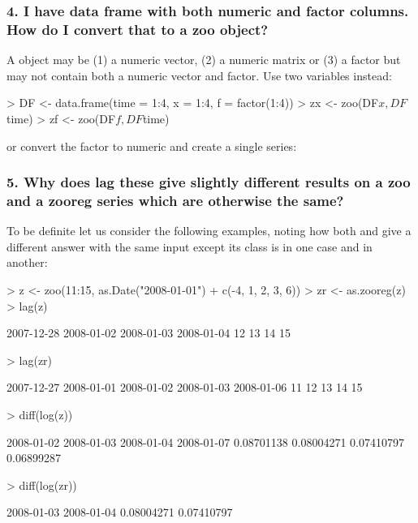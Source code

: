 \documentclass{Z}
\newcommand{\mysection}[1]{\subsubsection[#1]{\textbf{#1}}}
\begin{document}
\mysection{4. I have data frame with both numeric and factor columns.  How do I convert that to a zoo object?}

A  object may be (1) a numeric vector, (2) a numeric matrix or 
(3) a factor but may not contain both a numeric vector and factor.  
Use two  variables instead:

\begin{Schunk}
\begin{Sinput}
> DF <- data.frame(time = 1:4, x = 1:4, f = factor(1:4))
> zx <- zoo(DF$x, DF$time)
> zf <- zoo(DF$f, DF$time)
\end{Sinput}
\end{Schunk}

or convert the factor to numeric and create a single
 series:

\begin{Schunk}
\end{Schunk}

\mysection{5. Why does lag these give slightly different results on a zoo and a zooreg series which are otherwise the same?}

To be definite let us consider the following examples, noting how 
both  and  give a different answer with the same 
input except its class is  in one case and  in 
another:
\begin{Schunk}
\begin{Sinput}
> z <- zoo(11:15, as.Date("2008-01-01") + c(-4, 1, 2, 3, 6))
> zr <- as.zooreg(z)
> lag(z)
\end{Sinput}
\begin{Soutput}
2007-12-28 2008-01-02 2008-01-03 2008-01-04 
        12         13         14         15 
\end{Soutput}
\begin{Sinput}
> lag(zr)
\end{Sinput}
\begin{Soutput}
2007-12-27 2008-01-01 2008-01-02 2008-01-03 2008-01-06 
        11         12         13         14         15 
\end{Soutput}
\begin{Sinput}
> diff(log(z))
\end{Sinput}
\begin{Soutput}
2008-01-02 2008-01-03 2008-01-04 2008-01-07 
0.08701138 0.08004271 0.07410797 0.06899287 
\end{Soutput}
\begin{Sinput}
> diff(log(zr))
\end{Sinput}
\begin{Soutput}
2008-01-03 2008-01-04 
0.08004271 0.07410797 
\end{Soutput}
\end{Schunk}
\end{document}
